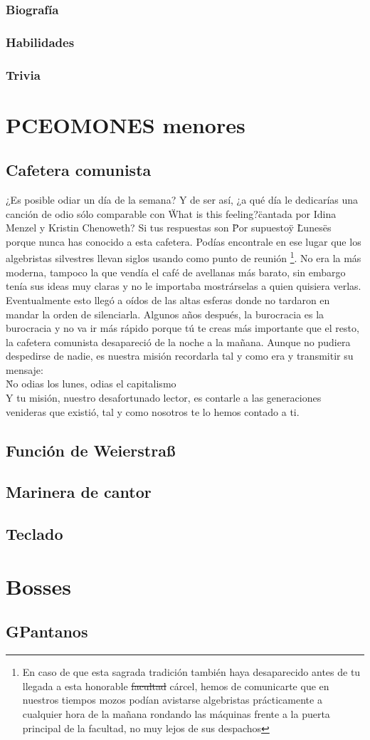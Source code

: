 \documentclass[letterpaper]{article}
\begin{document}
\subsubsection{Biografía}

\subsubsection{Habilidades}

\subsubsection{Trivia}
\section{PCEOMONES menores}
\subsection{Cafetera comunista}
¿Es posible odiar un día de la semana? Y de ser así, ¿a qué día le dedicarías una canción de odio sólo comparable con \"What is this feeling?\" cantada por Idina
Menzel y Kristin Chenoweth? Si tus respuestas son \"Por supuesto\" y \"Lunes\" es porque nunca has conocido a esta cafetera. Podías encontrale en ese lugar que los algebristas silvestres llevan siglos usando como punto de reunión \footnote{En caso de que esta sagrada tradición también haya desaparecido antes de tu llegada a esta honorable \sout{facultad} cárcel, hemos de comunicarte que en nuestros tiempos mozos podían avistarse algebristas prácticamente a cualquier hora de la mañana rondando las máquinas frente a la puerta principal de la facultad, no muy lejos de sus despachos}. No era la más moderna, tampoco la que
vendía el café de avellanas más barato, sin embargo tenía sus ideas muy claras y no le importaba mostrárselas a quien quisiera verlas. Eventualmente esto llegó a 
oídos de las altas esferas donde no tardaron en mandar la orden de silenciarla. Algunos años después, la burocracia es la burocracia y no va ir más rápido porque tú 
te creas más importante que el resto, la cafetera comunista desapareció de la noche a la mañana. Aunque no pudiera despedirse de nadie, es nuestra misión recordarla tal y como era y transmitir su mensaje:\\
 \"No odias los lunes, odias el capitalismo\"\\
Y tu misión, nuestro desafortunado lector, es contarle a las generaciones venideras que existió, tal y como nosotros te lo hemos contado a ti.


\subsection{Función de Weierstra{\ss}} %
\subsection{Marinera de cantor}
\subsection{Teclado}

\section{Bosses}
\subsection{GPantanos}
\end{document}
